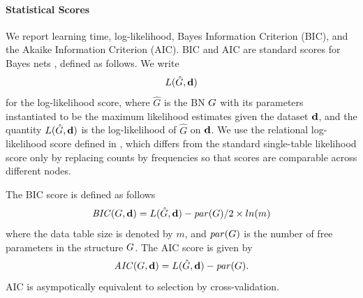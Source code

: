 \documentclass{vldb}
\begin{document}
\paragraph{Statistical Scores}
We report learning time, log-likelihood, Bayes Information Criterion (BIC), and the Akaike Information Criterion (AIC). BIC and AIC are standard scores for Bayes nets \cite{Chickering2003}, defined as follows. We write 
$$L(\hat{G},\mathbf{d})$$ for the log-likelihood score,
where $\hat{G}$ is the BN $G$ with its parameters instantiated to be the maximum likelihood estimates given the dataset $\mathbf{d}$, and the quantity $L(\hat{G},\mathbf{d})$ is the log-likelihood of $\hat{G}$ on $\mathbf{d}$. We use the relational log-likelihood score defined in \cite{Schulte2011}, which differs from the standard single-table likelihood score only by replacing counts by frequencies so that scores are comparable across different nodes.

The BIC score is defined as follows \cite{Chickering2003,Schulte2011}
$$\mathit{BIC}(G,\mathbf{d}) = L(\hat{G},\mathbf{d}) - \mathit{par}(G)/2 \times ln(m)$$
where the data table size is denoted by $m$, and $\mathit{par}(G)$ is the number of free parameters in the structure $G$. The AIC score is given by 
$$\mathit{AIC}(G,\mathbf{d}) = L(\hat{G},\mathbf{d}) - \mathit{par}(G). $$
AIC is asympotically equivalent to selection by cross-validation.
\end{document}
